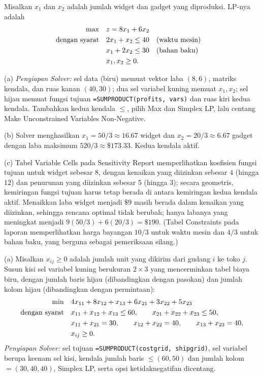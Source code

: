 Misalkan $x_1$ dan $x_2$ adalah jumlah widget dan gadget yang diproduksi. LP-nya adalah
\begin{align*}
\max \quad & z = 8x_1 + 6x_2\\
\mbox{dengan syarat}\quad & 2x_1 + x_2 \leq 40 && \mbox{(waktu mesin)}\\
& x_1 + 2x_2 \leq 30 && \mbox{(bahan baku)}\\
& x_1, x_2 \geq 0.
\end{align*}

(a) \emph{Penyiapan Solver:} sel data (biru) memuat vektor laba $(8,6)$, matriks kendala, dan ruas kanan $(40, 30)$; dua sel variabel kuning memuat $x_1, x_2$; sel hijau memuat fungsi tujuan \texttt{=SUMPRODUCT(profits, vars)} dan ruas kiri kedua kendala. Tambahkan kedua kendala $\leq$, pilih Max dan Simplex LP, lalu centang Make Unconstrained Variables Non-Negative.

(b) Solver menghasilkan $x_1 = 50/3 \approx 16.67$ widget dan $x_2 = 20/3 \approx 6.67$ gadget dengan laba maksimum $520/3 \approx \$173.33$. Kedua kendala aktif.

(c) Tabel Variable Cells pada Sensitivity Report memperlihatkan koefisien fungsi tujuan untuk widget sebesar $8$, dengan kenaikan yang diizinkan sebesar $4$ (hingga $12$) dan penurunan yang diizinkan sebesar $5$ (hingga $3$); secara geometris, kemiringan fungsi tujuan harus tetap berada di antara kemiringan kedua kendala aktif. Menaikkan laba widget menjadi $\$9$ masih berada dalam kenaikan yang diizinkan, sehingga rencana optimal tidak berubah; hanya labanya yang meningkat menjadi $9(50/3) + 6(20/3) = \$190$. (Tabel Constraints pada laporan memperlihatkan harga bayangan $10/3$ untuk waktu mesin dan $4/3$ untuk bahan baku, yang berguna sebagai pemeriksaan silang.)


(a) Misalkan $x_{ij} \geq 0$ adalah jumlah unit yang dikirim dari gudang $i$ ke toko $j$. Susun kisi sel variabel kuning berukuran $2 \times 3$ yang mencerminkan tabel biaya biru, dengan jumlah baris hijau (dibandingkan dengan pasokan) dan jumlah kolom hijau (dibandingkan dengan permintaan):
\begin{align*}
\min \quad & 4x_{11} + 8x_{12} + x_{13} + 6x_{21} + 3x_{22} + 5x_{23}\\
\mbox{dengan syarat}\quad & x_{11} + x_{12} + x_{13} \leq 60, \qquad x_{21} + x_{22} + x_{23} \leq 50,\\
& x_{11} + x_{21} = 30, \qquad x_{12} + x_{22} = 40, \qquad x_{13} + x_{23} = 40,\\
& x_{ij} \geq 0.
\end{align*}
\emph{Penyiapan Solver:} sel tujuan \texttt{=SUMPRODUCT(costgrid, shipgrid)}, sel variabel berupa keenam sel kisi, kendala jumlah baris $\leq (60, 50)$ dan jumlah kolom $= (30, 40, 40)$, Simplex LP, serta opsi ketidaknegatifan dicentang.

